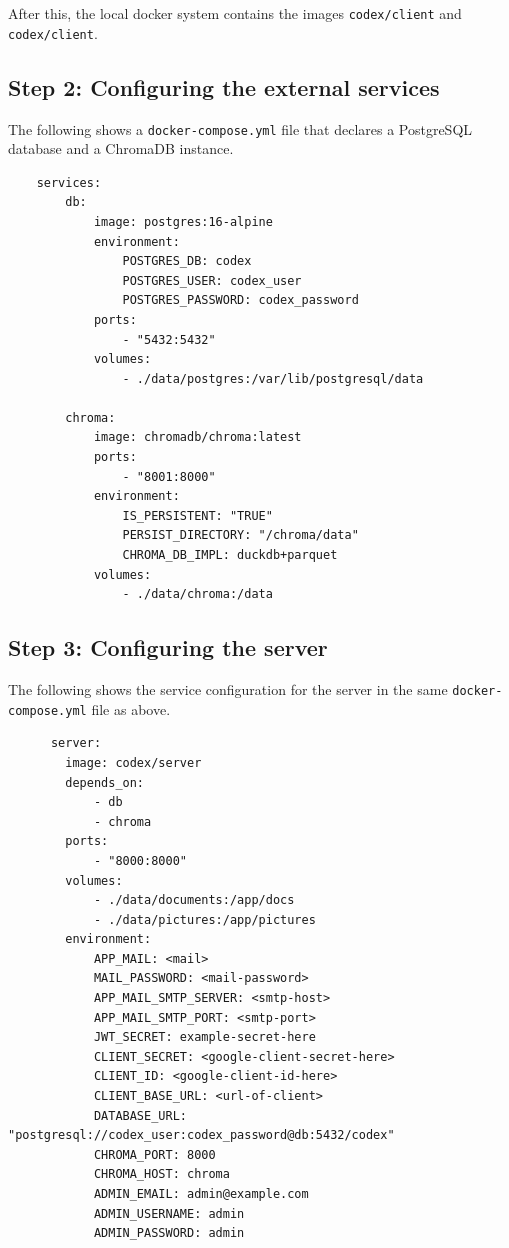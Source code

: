 After this, the local docker system contains the images \texttt{codex/client} and \texttt{codex/client}.

\subsection{Step 2: Configuring the external services}

The following shows a \texttt{docker-compose.yml} file that declares a PostgreSQL database and a ChromaDB instance.

\begin{verbatim}
    services:
        db:
            image: postgres:16-alpine
            environment:
                POSTGRES_DB: codex
                POSTGRES_USER: codex_user
                POSTGRES_PASSWORD: codex_password
            ports:
                - "5432:5432"
            volumes:
                - ./data/postgres:/var/lib/postgresql/data

        chroma:
            image: chromadb/chroma:latest
            ports:
                - "8001:8000"
            environment:
                IS_PERSISTENT: "TRUE"
                PERSIST_DIRECTORY: "/chroma/data"
                CHROMA_DB_IMPL: duckdb+parquet
            volumes:
                - ./data/chroma:/data
\end{verbatim}

\subsection{Step 3: Configuring the server}

The following shows the service configuration for the server in the same \texttt{docker-compose.yml} file as above.

\begin{verbatim}
      server:
        image: codex/server
        depends_on:
            - db
            - chroma
        ports:
            - "8000:8000"
        volumes:
            - ./data/documents:/app/docs
            - ./data/pictures:/app/pictures
        environment:
            APP_MAIL: <mail>
            MAIL_PASSWORD: <mail-password>
            APP_MAIL_SMTP_SERVER: <smtp-host>
            APP_MAIL_SMTP_PORT: <smtp-port>
            JWT_SECRET: example-secret-here
            CLIENT_SECRET: <google-client-secret-here>
            CLIENT_ID: <google-client-id-here>
            CLIENT_BASE_URL: <url-of-client>
            DATABASE_URL: "postgresql://codex_user:codex_password@db:5432/codex"
            CHROMA_PORT: 8000
            CHROMA_HOST: chroma
            ADMIN_EMAIL: admin@example.com
            ADMIN_USERNAME: admin
            ADMIN_PASSWORD: admin
\end{verbatim}


